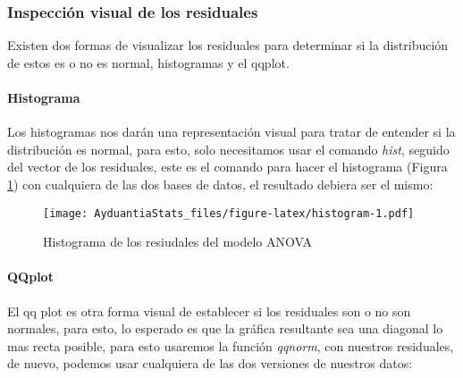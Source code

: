 \documentclass[]{book}
\newenvironment{Shaded}{\begin{snugshade}}{\end{snugshade}}
\newcommand{\KeywordTok}[1]{\textcolor[rgb]{0.13,0.29,0.53}{\textbf{#1}}}
\newcommand{\NormalTok}[1]{#1}
\newcommand{\OperatorTok}[1]{\textcolor[rgb]{0.81,0.36,0.00}{\textbf{#1}}}
\let\oldparagraph\paragraph
\renewcommand{\paragraph}[1]{\oldparagraph{#1}\mbox{}}
\begin{document}
\hypertarget{inspeccion-visual-de-los-residuales}{%
\subsubsection{Inspección visual de los residuales}\label{inspeccion-visual-de-los-residuales}}

Existen dos formas de visualizar los residuales para determinar si la distribución de estos es o no es normal, histogramas y el qqplot.

\hypertarget{histograma}{%
\paragraph{Histograma}\label{histograma}}

Los histogramas nos darán una representación visual para tratar de entender si la distribución es normal, para esto, solo necesitamos usar el comando \emph{hist}, seguido del vector de los residuales, este es el comando para hacer el histograma (Figura \ref{fig:histogram}) con cualquiera de las dos bases de datos, el resultado debiera ser el mismo:

\begin{Shaded}
\end{Shaded}

\begin{figure}
\centering
\texttt{[image: AyduantiaStats\_files/figure-latex/histogram-1.pdf]}
\caption{\label{fig:histogram}Histograma de los resiudales del modelo ANOVA}
\end{figure}

\hypertarget{qqplot}{%
\paragraph{QQplot}\label{qqplot}}

El qq plot es otra forma visual de establecer si los residuales son o no son normales, para esto, lo esperado es que la gráfica resultante sea una diagonal lo mas recta posible, para esto usaremos la función \emph{qqnorm}, con nuestros residuales, de nuevo, podemos usar cualquiera de las dos versiones de nuestros datos:

\begin{Shaded}
\end{Shaded}
\end{document}
